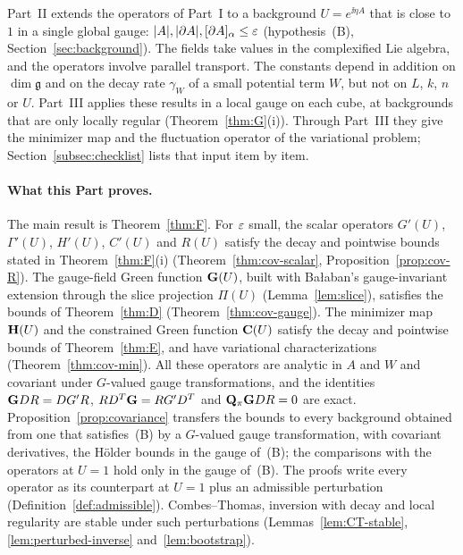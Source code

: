 \label{intro:II}
Part~II extends the operators of Part~I to a background $U=e^{\ii\eta A}$ that is close to $1$ in a single global gauge: $|A|,|\partial A|,[\partial A]_\alpha\le\varepsilon$ (hypothesis~(B), Section~\ref{sec:background}). The fields take values in the complexified Lie algebra, and the operators involve parallel transport. The constants depend in addition on $\dim\mathfrak g$ and on the decay rate $\gamma_W$ of a small potential term $W$, but not on $L$, $k$, $n$ or $U$. Part~III applies these results in a local gauge on each cube, at backgrounds that are only locally regular (Theorem~\ref{thm:G}(i)). Through Part~III they give the minimizer map and the fluctuation operator of the variational problem; Section~\ref{subsec:checklist} lists that input item by item.

\paragraph{What this Part proves.} The main result is Theorem~\ref{thm:F}. For $\varepsilon$ small, the scalar operators $G'(U)$, $\Gamma'(U)$, $H'(U)$, $C'(U)$ and $R(U)$ satisfy the decay and pointwise bounds stated in Theorem~\ref{thm:F}(i) (Theorem~\ref{thm:cov-scalar}, Proposition~\ref{prop:cov-R}). The gauge-field Green function $\mathbf G(U)$, built with Ba\l aban's gauge-invariant extension through the slice projection $\Pi(U)$ (Lemma~\ref{lem:slice}), satisfies the bounds of Theorem~\ref{thm:D} (Theorem~\ref{thm:cov-gauge}). The minimizer map $\mathbf H(U)$ and the constrained Green function $\mathbf C(U)$ satisfy the decay and pointwise bounds of Theorem~\ref{thm:E}, and have variational characterizations (Theorem~\ref{thm:cov-min}). All these operators are analytic in $A$ and $W$ and covariant under $G$-valued gauge transformations, and the identities $\mathbf G DR=DG'R$, $RD^T\mathbf G=RG'D^T$ and $\mathbf Q_\pi\mathbf G DR=0$ are exact. Proposition~\ref{prop:covariance} transfers the bounds to every background obtained from one that satisfies~(B) by a $G$-valued gauge transformation, with covariant derivatives, the H\"older bounds in the gauge of~(B); the comparisons with the operators at $U=1$ hold only in the gauge of~(B). The proofs write every operator as its counterpart at $U=1$ plus an admissible perturbation (Definition~\ref{def:admissible}). Combes--Thomas, inversion with decay and local regularity are stable under such perturbations (Lemmas~\ref{lem:CT-stable}, \ref{lem:perturbed-inverse} and~\ref{lem:bootstrap}).

